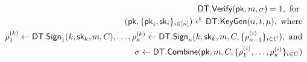   \begin{align*}
    \dthreshsig.\verify(\pkgroup, \msg, \sigma) = 1, \text{ for } \\
    (\pkgroup, \{ \pk_i, \sk_i \}_{i \in \set{n}}) \rgets \dthreshsig.\keygen(n, \thresh,\minsigners),
    \text{ where}\\
    \tsigmsg_{1} \gets \dthreshsig.\sign_1(\partyid, \sk_\partyid, \msg, \coalition),
    \ldots,
    \tsigmsg_{\numrounds } \gets \dthreshsig.\sign_\numrounds(\partyid, \sk_\partyid, \msg, \coalition, \{\tsigmsgin_{\numrounds-1} \}_{i \in \coalition}), \text{ and} \\
    \sigma \gets \dthreshsig.\combine(\pkgroup, \msg, \coalition, \{ \tsigmsgin_{1}, \ldots, \tsigmsgin_{\numrounds } \}_{i \in \coalition})
  \end{align*}

